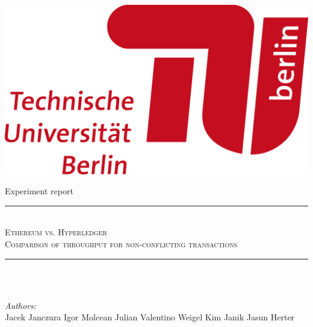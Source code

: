\documentclass[12pt]{article}
\makeatletter
\let\thetitle\@title
\makeatother
\begin{document}

\begin{titlepage}
	\centering
    
    \includegraphics[scale = 0.75]{Logo.png} \\[1.0 cm]
    
    \vspace{4 cm}
    
    {\LARGE Experiment report} \\[0.2 cm]
    
    \vspace{1 cm}
    
    \rule{\linewidth}{0.2 mm} \\[0.4 cm]
    
	\textsc{\LARGE Ethereum vs. Hyperledger}\\[0.2 cm]
	\textsc{\lARGE Comparison of throughput for non-conflicting transactions} \\[0.2 cm]
	\rule{\linewidth}{0.2 mm} \\[0.4 cm]
	
	{\huge \bfseries \thetitle}\\
	
	\vspace{2 cm}
	
	\begin{minipage}{0.4\textwidth}
		
		\begin{flushleft} 
			\emph{Authors:} \\
			Jacek Janczura \linebreak
			Igor Molcean \linebreak
			Julian Valentino Weigel \linebreak
			Kim Janik Jasun Herter
		\end{flushleft}
	\end{minipage}\\[2 cm]
	

 
	\vfill
	
\end{titlepage}
\end{document}
